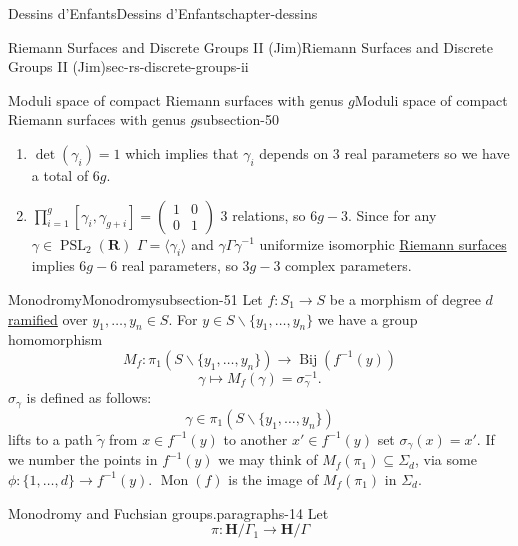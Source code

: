 \documentclass[oneside,10pt,]{book}
\numberwithin{equation}{section}
\newcommand{\inv}{^{-1}}
\newcommand{\lb}{[}
\newcommand{\rb}{]}
\newcommand{\RR}{\mathbf{R}}
\newcommand{\HH}{\mathbf{H}}
\DeclareMathOperator{\PSL}{PSL}
\newcommand{\amp}{&}
\begin{document}
\begin{chapterptx}{Dessins d'Enfants}{}{Dessins d'Enfants}{}{}{chapter-dessins}
\begin{sectionptx}{Riemann Surfaces and Discrete Groups II (Jim)}{}{Riemann Surfaces and Discrete Groups II (Jim)}{}{}{sec-rs-discrete-groups-ii}
\begin{subsectionptx}{Moduli space of compact Riemann surfaces with genus \(g\)}{}{Moduli space of compact Riemann surfaces with genus \(g\)}{}{}{subsection-50}
\begin{enumerate}
\item\hypertarget{li-109}{}\(\det(\gamma_i) = 1\) which implies that \(\gamma_i\) depends on 3 real parameters so we have a total of \(6g\).%
\item\hypertarget{li-110}{}\(\prod_{i=1}^g \lb \gamma_i, \gamma_{g+i}\rb = \begin{pmatrix} 1\amp 0 \\ 0\amp 1\end{pmatrix}\) 3 relations, so \(6g- 3\). Since for any \(\gamma \in \PSL_2(\RR)\) \(\Gamma = \langle \gamma_i \rangle\) and \(\gamma\Gamma \gamma\inv\) uniformize isomorphic \hyperref[def-top-riem-surface]{Riemann surfaces} implies \(6g-6\) real parameters, so \(3g-3\) complex parameters.%
\end{enumerate}
%
\end{subsectionptx}
%
%
\typeout{************************************************}
\typeout{************************************************}
%
\begin{subsectionptx}{Monodromy}{}{Monodromy}{}{}{subsection-51}
\hypertarget{p-578}{}%
Let \(f\colon S_1 \to S\) be a morphism of degree \(d\) \hyperref[def-dess-ramified]{ramified} over \(y_1,\ldots, y_n \in S\). For \(y\in S\smallsetminus \{y_1,\ldots, y_n\}\) we have a group homomorphism%
\begin{equation*}
M_f\colon \pi_1(S \smallsetminus \{y_1, \ldots, y_n\} )\to \operatorname{Bij} (f\inv (y))
\end{equation*}
%
\begin{equation*}
\gamma \mapsto M_f(\gamma) = \sigma_\gamma\inv\text{.}
\end{equation*}
\(\sigma_\gamma\) is defined as follows:%
\begin{equation*}
\gamma \in \pi_1(S\smallsetminus \{ y_1,\ldots, y_n\})
\end{equation*}
lifts to a path \(\widetilde \gamma\) from \(x\in f\inv(y)\) to another \(x' \in f\inv(y)\) set \(\sigma_\gamma(x) =x'\). If we number the points in \(f\inv (y)\) we may think of \(M_f(\pi_1)\subseteq \Sigma_d\), via some \(\phi\colon \{1,\ldots, d\}\to f\inv (y)\). \(\operatorname{Mon}(f)\) is the image of \(M_f(\pi_1)\) in \(\Sigma_d\).%
\begin{paragraphs}{Monodromy and Fuchsian groups.}{paragraphs-14}%
\hypertarget{p-579}{}%
Let%
\begin{equation*}
\pi \colon \HH/\Gamma_1 \to \HH/ \Gamma
\end{equation*}

\end{paragraphs}
\end{subsectionptx}
\end{sectionptx}
\end{chapterptx}
\end{document}
